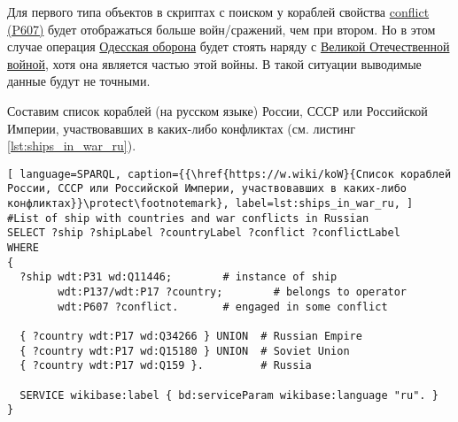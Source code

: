 Для первого типа объектов в скриптах с поиском у кораблей свойства \href{https://www.wikidata.org/wiki/Property:P607}{conflict (P607)} будет отображаться больше войн/сражений, чем при втором. Но в этом случае операция \href{https://ru.wikipedia.org/wiki/Одесская_оборона_(1941)}{Одесская оборона} будет стоять наряду с \href{https://ru.wikipedia.org/wiki/Великая_Отечественная_война}{Великой Отечественной войной}, хотя она является частью этой войны. В такой ситуации выводимые данные будут не точными.

\label{question:ship_2}

\label{question:ship_3}

Составим список кораблей (на русском языке) России, СССР или Российской Империи, участвовавших в каких-либо конфликтах (см. листинг \ref{lst:ships_in_war_ru}).

\begin{lstlisting}[ language=SPARQL, caption={{\href{https://w.wiki/koW}{Список кораблей России, СССР или Российской Империи, участвовавших в каких-либо конфликтах}}\protect\footnotemark}, label=lst:ships_in_war_ru, ]
#List of ship with countries and war conflicts in Russian
SELECT ?ship ?shipLabel ?countryLabel ?conflict ?conflictLabel
WHERE
{
  ?ship wdt:P31 wd:Q11446;        # instance of ship
        wdt:P137/wdt:P17 ?country;        # belongs to operator
        wdt:P607 ?conflict.       # engaged in some conflict
  
  { ?country wdt:P17 wd:Q34266 } UNION  # Russian Empire
  { ?country wdt:P17 wd:Q15180 } UNION  # Soviet Union
  { ?country wdt:P17 wd:Q159 }.         # Russia

  SERVICE wikibase:label { bd:serviceParam wikibase:language "ru". }
}
\end{lstlisting}
  


